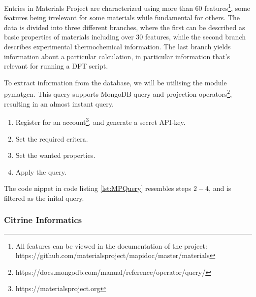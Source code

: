 Entries in Materials Project are characterized using more than 60 features\footnote{All features can be viewed in the documentation of the project: https://github.com/materialsproject/mapidoc/master/materials}, some features being irrelevant for some materials while fundamental for others. The data is divided into three different branches, where the first can be described as basic properties of materials including over $30$ features, while the second branch describes experimental thermochemical information. The last branch yields information about a particular calculation, in particular information that's relevant for running a DFT script.

To extract information from the database, we will be utilising the module pymatgen. This query supports MongoDB query and projection operators\footnote{https://docs.mongodb.com/manual/reference/operator/query/}, resulting in an almost instant query.

\begin{enumerate}
  \item Register for an account\footnote{https://materialsproject.org}, and generate a secret API-key.
  \item Set the required critera.
  \item Set the wanted properties.
  \item Apply the query.
\end{enumerate}

The code nippet in code listing \ref{lst:MPQuery} resembles steps $2-4$, and is filtered as the inital query. %



\subsubsection{Citrine Informatics}

